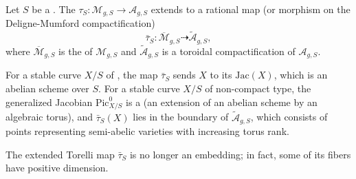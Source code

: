 \begin{definition} \label{definition:extended_torelli_map_over_a_scheme}
    Let $S$ be a . The  $\tau_S\colon \mathcal{M}_{g, S} \to \mathcal{A}_{g, S}$ extends to a rational map (or morphism on the Deligne-Mumford compactification)
    $$\bar{\tau}_S\colon \overline{\mathcal{M}}_{g, S} \dashrightarrow \tilde{\mathcal{A}}_{g, S},$$
    where $\overline{\mathcal{M}}_{g, S}$ is the  of $\mathcal{M}_{g, S}$ and $\tilde{\mathcal{A}}_{g, S}$ is a toroidal compactification of $\mathcal{A}_{g, S}$.

    For a stable curve $X/S$ of , the map $\bar{\tau}_S$ sends $X$ to its  $\mathrm{Jac}(X)$, which is an abelian scheme over $S$. For a stable curve $X/S$ of non-compact type, the generalized Jacobian $\mathrm{Pic}^0_{X/S}$ is a  (an extension of an abelian scheme by an algebraic torus), and $\bar{\tau}_S(X)$ lies in the boundary of $\tilde{\mathcal{A}}_{g, S}$, which consists of points representing semi-abelic varieties with increasing torus rank.

    The extended Torelli map $\bar{\tau}_S$ is no longer an embedding; in fact, some of its fibers have positive dimension.
\end{definition}
